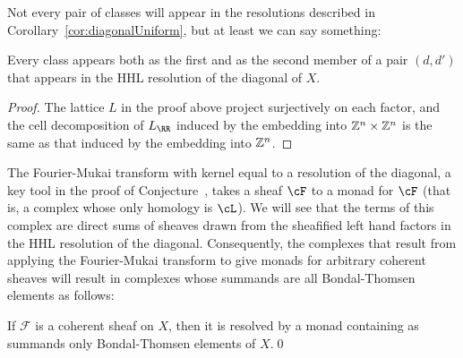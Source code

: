 \documentclass{amsart}
\begin{document}
Not every pair of \BT classes will appear in the resolutions described in Corollary~\ref{cor:diagonalUniform},
but at least we can say something:
\begin{cor}\label{cor:diagonal-BTcollection}
Every \BT class appears both as the first and as the second member of a pair $(d,d')$ that appears in the HHL resolution of the diagonal of $X$. \end{cor}
\begin{proof}
The lattice $L$ in the proof above project surjectively on each factor, and the cell decomposition of $L_{\RR}$
induced by the embedding into $\mathbb Z^{n}\times \mathbb Z^{n}$ is the same as that induced by the embedding into
$\mathbb Z^{n}$.
\end{proof}

The Fourier-Mukai transform with kernel equal to a resolution of the diagonal,  a key tool in the proof of Conjecture~\cite{BES}, takes a sheaf $\cF$ to a monad for $\cF$ (that is, a complex whose only homology is $\cL$).  We will see  that the terms of this complex are direct sums of sheaves
 drawn from the sheafified left hand factors in the HHL resolution of the diagonal. Consequently, the complexes that result from applying the Fourier-Mukai transform to give monads for arbitrary coherent sheaves will result in complexes whose summands are all Bondal-Thomsen elements as follows:

\begin{cor}
  If $\mathcal{F}$ is a coherent sheaf on $X$, then it is resolved by a monad containing as summands only Bondal-Thomsen elements of $X$.\qed
\end{cor}
\end{document}
